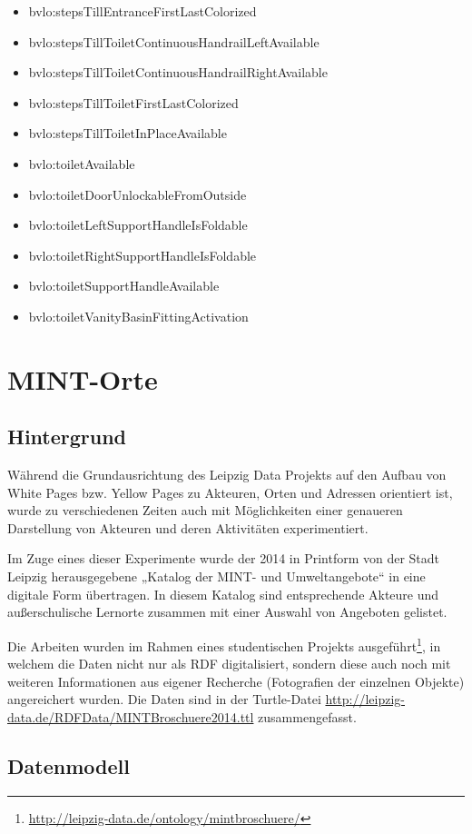 \documentclass[a4paper,11pt]{article}
\begin{document}
\begin{itemize}
\item bvlo:stepsTillEntranceFirstLastColorized
\item bvlo:stepsTillToiletContinuousHandrailLeftAvailable
\item bvlo:stepsTillToiletContinuousHandrailRightAvailable
\item bvlo:stepsTillToiletFirstLastColorized
\item bvlo:stepsTillToiletInPlaceAvailable
\item bvlo:toiletAvailable
\item bvlo:toiletDoorUnlockableFromOutside
\item bvlo:toiletLeftSupportHandleIsFoldable
\item bvlo:toiletRightSupportHandleIsFoldable
\item bvlo:toiletSupportHandleAvailable
\item bvlo:toiletVanityBasinFittingActivation
\end{itemize}

\section{MINT-Orte}

\subsection{Hintergrund}
Während die Grundausrichtung des Leipzig Data Projekts auf den Aufbau von White
Pages bzw. Yellow Pages zu Akteuren, Orten und Adressen orientiert ist, wurde
zu verschiedenen Zeiten auch mit Möglichkeiten einer genaueren Darstellung von
Akteuren und deren Aktivitäten experimentiert.

Im Zuge eines dieser Experimente wurde der 2014 in Printform von der Stadt
Leipzig herausgegebene „Katalog der MINT- und Umweltangebote“ in eine digitale
Form übertragen. In diesem Katalog sind entsprechende Akteure und
außerschulische Lernorte zusammen mit einer Auswahl von Angeboten gelistet.

Die Arbeiten wurden im Rahmen eines studentischen Projekts
ausgeführt\footnote{\url{http://leipzig-data.de/ontology/mintbroschuere/}}, in
welchem die Daten nicht nur als RDF digitalisiert, sondern diese auch noch mit
weiteren Informationen aus eigener Recherche (Fotografien der einzelnen
Objekte) angereichert wurden. Die Daten sind in der Turtle-Datei
\url{http://leipzig-data.de/RDFData/MINTBroschuere2014.ttl} zusammengefasst.

\subsection{Datenmodell}
\end{document}
